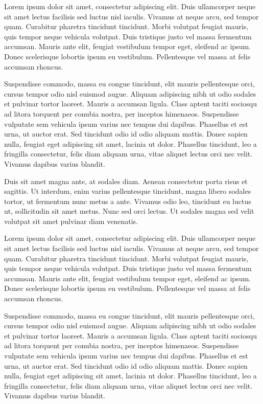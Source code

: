 \documentclass[11pt, a4paper]{awesome-cv}
\begin{document}
\begin{cvletter}

\begin{en}
Lorem ipsum dolor sit amet, consectetur adipiscing elit. Duis ullamcorper neque sit amet lectus facilisis sed luctus nisl iaculis. Vivamus at neque arcu, sed tempor quam. Curabitur pharetra tincidunt tincidunt. Morbi volutpat feugiat mauris, quis tempor neque vehicula volutpat. Duis tristique justo vel massa fermentum accumsan. Mauris ante elit, feugiat vestibulum tempor eget, eleifend ac ipsum. Donec scelerisque lobortis ipsum eu vestibulum. Pellentesque vel massa at felis accumsan rhoncus.

Suspendisse commodo, massa eu congue tincidunt, elit mauris pellentesque orci, cursus tempor odio nisl euismod augue. Aliquam adipiscing nibh ut odio sodales et pulvinar tortor laoreet. Mauris a accumsan ligula. Class aptent taciti sociosqu ad litora torquent per conubia nostra, per inceptos himenaeos. Suspendisse vulputate sem vehicula ipsum varius nec tempus dui dapibus. Phasellus et est urna, ut auctor erat. Sed tincidunt odio id odio aliquam mattis. Donec sapien nulla, feugiat eget adipiscing sit amet, lacinia ut dolor. Phasellus tincidunt, leo a fringilla consectetur, felis diam aliquam urna, vitae aliquet lectus orci nec velit. Vivamus dapibus varius blandit.

Duis sit amet magna ante, at sodales diam. Aenean consectetur porta risus et sagittis. Ut interdum, enim varius pellentesque tincidunt, magna libero sodales tortor, ut fermentum nunc metus a ante. Vivamus odio leo, tincidunt eu luctus ut, sollicitudin sit amet metus. Nunc sed orci lectus. Ut sodales magna sed velit volutpat sit amet pulvinar diam venenatis.
\end{en}

\begin{it}
Lorem ipsum dolor sit amet, consectetur adipiscing elit. Duis ullamcorper neque sit amet lectus facilisis sed luctus nisl iaculis. Vivamus at neque arcu, sed tempor quam. Curabitur pharetra tincidunt tincidunt. Morbi volutpat feugiat mauris, quis tempor neque vehicula volutpat. Duis tristique justo vel massa fermentum accumsan. Mauris ante elit, feugiat vestibulum tempor eget, eleifend ac ipsum. Donec scelerisque lobortis ipsum eu vestibulum. Pellentesque vel massa at felis accumsan rhoncus.

Suspendisse commodo, massa eu congue tincidunt, elit mauris pellentesque orci, cursus tempor odio nisl euismod augue. Aliquam adipiscing nibh ut odio sodales et pulvinar tortor laoreet. Mauris a accumsan ligula. Class aptent taciti sociosqu ad litora torquent per conubia nostra, per inceptos himenaeos. Suspendisse vulputate sem vehicula ipsum varius nec tempus dui dapibus. Phasellus et est urna, ut auctor erat. Sed tincidunt odio id odio aliquam mattis. Donec sapien nulla, feugiat eget adipiscing sit amet, lacinia ut dolor. Phasellus tincidunt, leo a fringilla consectetur, felis diam aliquam urna, vitae aliquet lectus orci nec velit. Vivamus dapibus varius blandit.


\end{it}
\end{cvletter}
\end{document}
